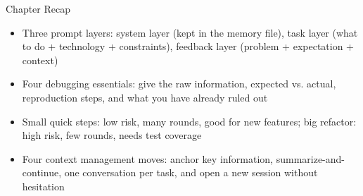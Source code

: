 \begin{tcbsummary}{Chapter Recap}
\begin{itemize}
  \item Three prompt layers: system layer (kept in the memory file), task layer (what to do + technology + constraints), feedback layer (problem + expectation + context)
  \item Four debugging essentials: give the raw information, expected vs. actual, reproduction steps, and what you have already ruled out
  \item Small quick steps: low risk, many rounds, good for new features; big refactor: high risk, few rounds, needs test coverage
  \item Four context management moves: anchor key information, summarize-and-continue, one conversation per task, and open a new session without hesitation
\end{itemize}

\end{tcbsummary}
